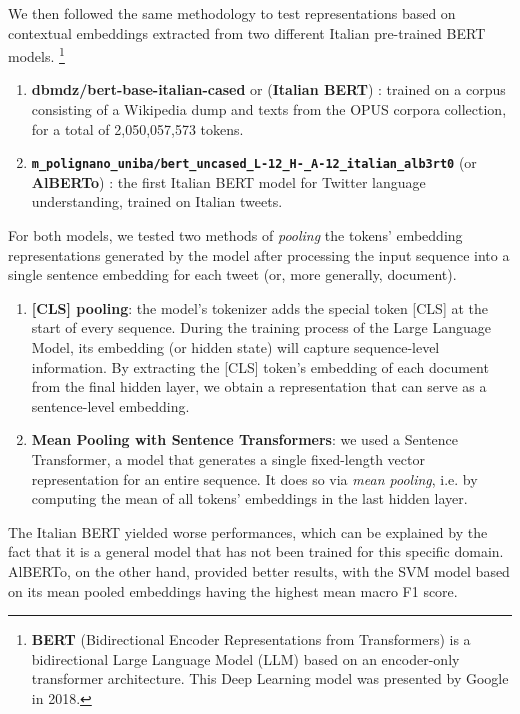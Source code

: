 We then followed the same methodology to test representations based on contextual embeddings extracted from two different Italian pre-trained BERT models. \footnote{\textbf{BERT} (Bidirectional Encoder Representations from Transformers) is a bidirectional Large Language Model (LLM) based on an encoder-only transformer architecture. This Deep Learning model was presented by Google in 2018.}
\begin{enumerate}
    \item \textbf{dbmdz/bert-base-italian-cased} or (\textbf{Italian BERT}) \cite{italian_bert}:  trained on a corpus consisting of a Wikipedia dump and texts from the OPUS corpora collection, for a total of 2,050,057,573 tokens.
    \item \texttt{\textbf{m\_polignano\_uniba/bert\_uncased\_L{-}12\_H{-}\_A{-}12\_italian\_alb3rt0}} (or \textbf{AlBERTo}) \cite{alberto}:  the first Italian BERT model for Twitter language understanding, trained on Italian tweets.
\end{enumerate}

For both models, we tested two methods of \textit{pooling} the tokens' embedding representations generated by the model after processing the input sequence into a single sentence embedding for each tweet (or, more generally, document).
\begin{enumerate}
    \item \textbf{[CLS] pooling}: the model's tokenizer adds the special token [CLS] at the start of every sequence. During the training process of the Large Language Model, its embedding (or hidden state) will capture sequence-level information. By extracting the [CLS] token's embedding of each document from the final hidden layer, we obtain a representation that can serve as a sentence-level embedding.
    \item \textbf{Mean Pooling with Sentence Transformers}: we used a Sentence Transformer, a model that generates a single fixed-length vector representation for an entire sequence. It does so via \textit{mean pooling}, i.e. by computing the mean of all tokens' embeddings in the last hidden layer.
\end{enumerate}

The Italian BERT yielded worse performances, which can be explained by the fact that it is a general model that has not been trained for this specific domain. AlBERTo, on the other hand, provided better results, with the SVM model based on its mean pooled embeddings having the highest mean macro F1 score.
    
